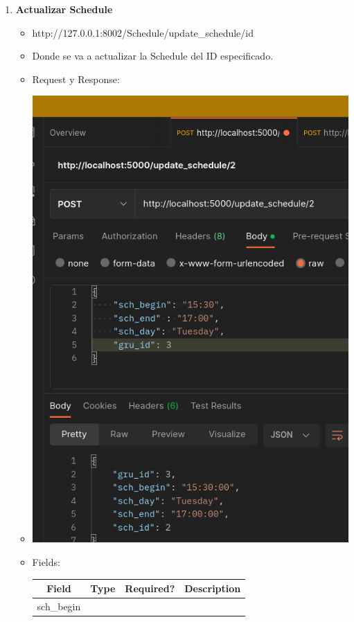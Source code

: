 \documentclass{article}
\begin{document}
\begin{enumerate}
    \item \textbf{Actualizar Schedule}
    \begin{itemize}
        \item http://127.0.0.1:8002/Schedule/update\_schedule/id
        \item Donde se va a actualizar la Schedule del ID especificado.
        \item Request y Response:
        \item \includegraphics[scale=.5]{assets/schedule/update.png}
        \item Fields:
        \begin{table}[H] \centering \begin{tabular}{|l|l|l|l|} \hline
        \multicolumn{1}{|c|}{\textbf{Field}} &
        \multicolumn{1}{c|}{\textbf{Type}} &
        \multicolumn{1}{c|}{\textbf{Required?}} &
        \multicolumn{1}{c|}{\textbf{Description}} \\ \hline sch\_begin &

\end{tabular}
\end{table}
\end{itemize}
\end{enumerate}
\end{document}

